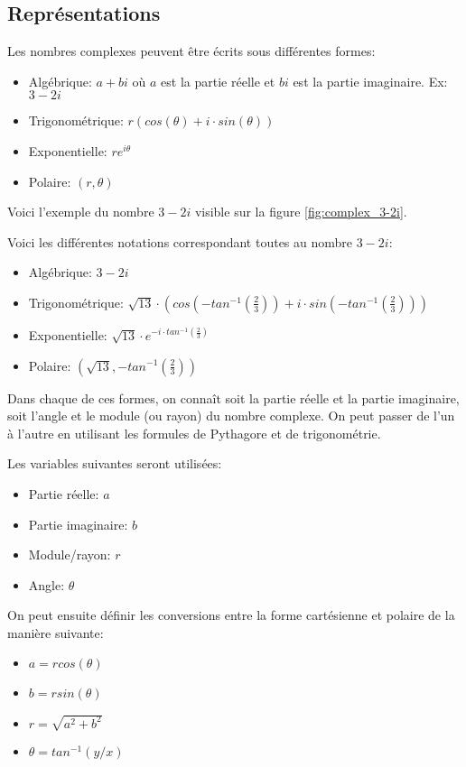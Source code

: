 \subsection{Représentations}
\label{sec:complex_representations}

Les nombres complexes peuvent être écrits sous différentes formes:
\begin{itemize}
    \item Algébrique: $a + bi$ où $a$ est la partie réelle et $bi$ est la partie imaginaire. Ex: $3 - 2i$
    \item Trigonométrique: $r(cos(\theta) + i \cdot sin(\theta))$
    \item Exponentielle: $re^{i\theta}$
    \item Polaire: $(r, \theta)$
\end{itemize}

Voici l'exemple du nombre $3 - 2i$ visible sur la figure \ref{fig:complex_3-2i}.

\begin{minipage}{\linewidth}
\label{fig:complex_3-2i}
\end{minipage}

Voici les différentes notations correspondant toutes au nombre $3 - 2i$:
\begin{itemize}
    \item Algébrique: $3 - 2i$
    \item Trigonométrique: $\sqrt{13} \cdot (cos(-tan^{-1}(\frac{2}{3})) + i \cdot sin(-tan^{-1}(\frac{2}{3})))$
    \item Exponentielle: $\sqrt{13} \cdot e^{-i \cdot tan^{-1}(\frac{2}{3})}$
    \item Polaire: $(\sqrt{13}, -tan^{-1}(\frac{2}{3}))$
\end{itemize}

Dans chaque de ces formes, on connaît soit la partie réelle et la partie imaginaire, soit l'angle et le module (ou rayon) du nombre complexe. On peut passer de l'un à l'autre en utilisant les formules de Pythagore et de trigonométrie.

Les variables suivantes seront utilisées:
\begin{itemize}
    \item Partie réelle: $a$
    \item Partie imaginaire: $b$
    \item Module/rayon: $r$
    \item Angle: $\theta$
\end{itemize}

On peut ensuite définir les conversions entre la forme cartésienne et polaire de la manière suivante:
\begin{itemize}
    \item $a = r cos(\theta)$
    \item $b = r sin(\theta)$
    \item $r = \sqrt{a^2 + b^2}$
    \item $\theta = tan^{-1}(y/x)$
\end{itemize}
